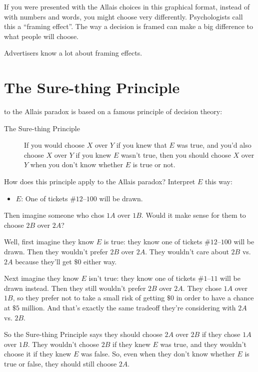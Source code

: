 \documentclass[justified]{tufte-book}
\providecommand{\tightlist}{%
  \setlength{\itemsep}{0pt}\setlength{\parskip}{0pt}}
\theoremstyle{definition}
\theoremstyle{definition}
\theoremstyle{definition}
\theoremstyle{remark}
\begin{document}
If you were presented with the Allais choices in this graphical format, instead of with numbers and words, you might choose very differently. Psychologists call this a ``framing effect''. The way a decision is framed can make a big difference to what people will choose.

Advertisers know a lot about framing effects.

\hypertarget{the-sure-thing-principle}{%
\section{The Sure-thing Principle}\label{the-sure-thing-principle}}

 to the Allais paradox is based on a famous principle of decision theory:

\begin{description}
\item[The Sure-thing Principle]
If you would choose \(X\) over \(Y\) if you knew that \(E\) was true, and you'd also choose \(X\) over \(Y\) if you knew \(E\) wasn't true, then you should choose \(X\) over \(Y\) when you don't know whether \(E\) is true or not.
\end{description}

How does this principle apply to the Allais paradox? Interpret \(E\) this way:

\begin{itemize}
\tightlist
\item
  \(E\): One of tickets \#\(12\)--\(100\) will be drawn.
\end{itemize}

Then imagine someone who chos \(1A\) over \(1B\). Would it make sense for them to choose \(2B\) over \(2A\)?

Well, first imagine they know \(E\) is true: they know one of tickets \(\#12\)--\(100\) will be drawn. Then they wouldn't prefer \(2B\) over \(2A\). They wouldn't care about \(2B\) vs. \(2A\) because they'll get \(\$0\) either way.

Next imagine they know \(E\) isn't true: they know one of tickets \(\#1\)--\(11\) will be drawn instead. Then they still wouldn't prefer \(2B\) over \(2A\). They chose \(1A\) over \(1B\), so they prefer not to take a small risk of getting \(\$0\) in order to have a chance at \(\$5\) million. And that's exactly the same tradeoff they're considering with \(2A\) vs. \(2B\).

So the Sure-thing Principle says they should choose \(2A\) over \(2B\) if they chose \(1A\) over \(1B\). They wouldn't choose \(2B\) if they knew \(E\) was true, and they wouldn't choose it if they knew \(E\) was false. So, even when they don't know whether \(E\) is true or false, they should still choose \(2A\).
\end{document}
